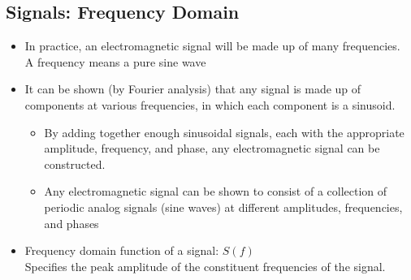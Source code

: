 \documentclass[11pt]{article}
\begin{document}
\subsection{Signals: Frequency Domain}
\begin{itemize}
    \item In practice, an electromagnetic signal will be made up of many frequencies. \\
    A frequency means a pure sine wave
    \item It can be shown (by Fourier analysis) that any signal is made up of components at various frequencies, in which each component is a sinusoid.
    \begin{itemize}
        \item By adding together enough sinusoidal signals, each with the appropriate amplitude, frequency, and phase, any electromagnetic signal can be constructed.
        \item Any electromagnetic signal can be shown to consist of a collection of periodic analog signals (sine waves) at different amplitudes, frequencies, and phases
    \end{itemize}
    \item Frequency domain function of a signal:  \( S(f) \) \\
    Specifies the peak amplitude of the constituent frequencies of the signal.
\end{itemize}
\end{document}
